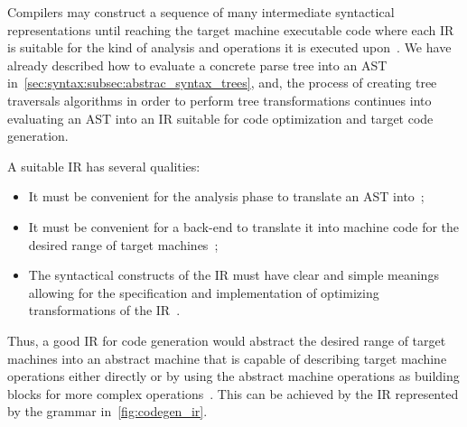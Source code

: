 \documentclass[
  oneside,
  english,
  coorientadorbanca,
  noabntexcite
]{ufsc-thesis-rn46-2019}
\begin{document}
Compilers may construct a sequence of many intermediate syntactical representations until reaching the target machine executable code where each IR is suitable for the kind of analysis and operations it is executed upon~\cite{Aho:2006:CPT:1177220}.
We have already described how to evaluate a concrete parse tree into an AST in~\cref{sec:syntax:subsec:abstrac_syntax_trees}, and, the process of creating tree traversals algorithms in order to perform tree transformations continues into evaluating an AST into an IR suitable for code optimization and target code generation.

A suitable IR has several qualities:
\begin{itemize}
  \item It must be convenient for the analysis phase to translate an AST into~\cite{appel2003modern};
  \item It must be convenient for a back-end to translate it into machine code for the desired range of target machines~\cite{appel2003modern};
  \item The syntactical constructs of the IR must have clear and simple meanings allowing for the specification and implementation of optimizing transformations of the IR~\cite{appel2003modern}.
\end{itemize}
Thus, a good IR for code generation would abstract the desired range of target machines into an abstract machine that is capable of describing target machine operations either directly or by using the abstract machine operations as building blocks for more complex operations~\cite{appel2003modern}.
This can be achieved by the IR represented by the grammar in~\cref{fig:codegen_ir}.
\end{document}
